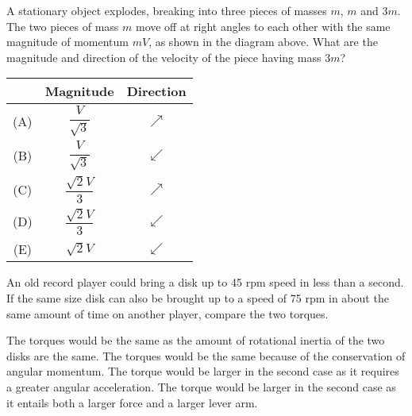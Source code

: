 \documentclass[12pt]{exam}
\begin{document}
\begin{questions}
  \question A stationary object explodes, breaking into three pieces of masses
  $m$, $m$ and $3m$. The two pieces of mass $m$ move off at right angles to each
  other with the same magnitude of momentum $mV$, as shown in the diagram
  above. What are the magnitude and direction of the velocity of the piece
  having mass $3m$?

  \begin{tabular}{ccc}
    & Magnitude & Direction \\
    \hline
    (A) & $\dfrac{V}{\sqrt{3}}$  & {\Huge $\nearrow$} \\
    (B) & $\dfrac{V}{\sqrt{3}}$  & {\Huge $\swarrow$} \\
    (C) & $\dfrac{\sqrt{2}V}{3}$ & {\Huge $\nearrow$} \\
    (D) & $\dfrac{\sqrt{2}V}{3}$ & {\Huge $\swarrow$} \\
    (E) & $\sqrt{2}V$ & {\Huge $\swarrow$}
  \end{tabular}
    
  \question An old record player could bring a disk up to 45 rpm speed in less
  than a second. If the same size disk can also be brought up to a speed of 75
  rpm in about the same amount of time on another player, compare the two
  torques.
  \begin{choices}
    \choice The torques would be the same as the amount of rotational inertia of
    the two disks are the same.
    \choice The torques would be the same because of the conservation of angular
    momentum.
    \choice The torque would be larger in the second case as it requires a
    greater angular acceleration.
    \choice The torque would be larger in the second case as it entails both a
    larger force and a larger lever arm.
  \end{choices}


\end{questions}
\end{document}
